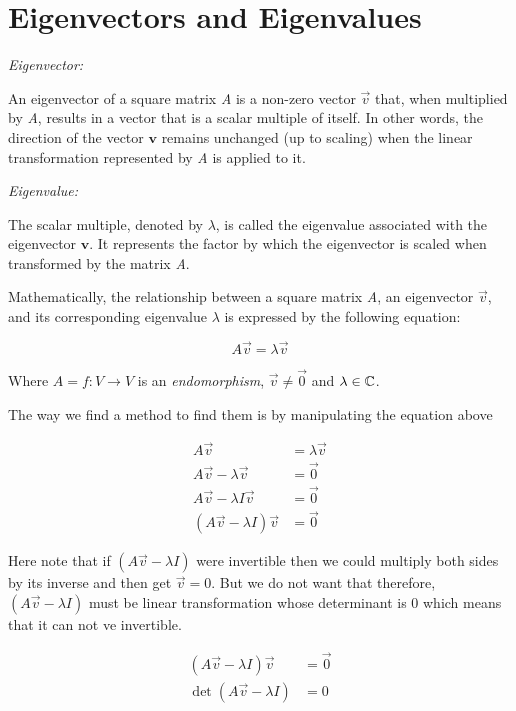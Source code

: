 \newpage
\section{Eigenvectors and Eigenvalues}

\emph{Eigenvector:}

An eigenvector of a square matrix \emph{A} is a non-zero vector \(\vec{v}\) that, when multiplied by 
\emph{A}, results in a vector that is a scalar multiple of itself. In other words, the direction of the 
vector \(\mathbf{v}\) remains unchanged (up to scaling) when the linear transformation represented by 
\emph{A} is applied to it.
\vspace{\baselineskip}

\emph{Eigenvalue:}

The scalar multiple, denoted by \(\lambda\), is called the eigenvalue associated with the eigenvector 
\(\mathbf{v}\). It represents the factor by which the eigenvector is scaled when transformed by 
the matrix \emph{A}.
\vspace{\baselineskip}

Mathematically, the relationship between a square matrix \emph{A}, an eigenvector \(\vec{v}\), 
and its corresponding eigenvalue \(\lambda\) is expressed by the following equation:

\[
    A\vec{v} = \lambda\vec{v}
\]

Where \(A = f: V \to V\) is an \emph{endomorphism}, \(\vec{v} \ne \vec{0}\) and  \(\lambda \in \mathbb{C}\).
\vspace{\baselineskip}

The way we find a method to find them is by manipulating the equation above

\begin{align*}    
    A\vec{v} &= \lambda\vec{v}\\
    A\vec{v} - \lambda\vec{v} &= \vec{0}\\
    A\vec{v} - \lambda I \vec{v} &= \vec{0}\\
    (A\vec{v} - \lambda I) \vec{v} &= \vec{0}
\end{align*}

Here note that if \((A\vec{v} - \lambda I)\) were invertible then we could multiply both sides by 
its inverse and then get \(\vec{v} = 0\). But we do not want that therefore, \((A\vec{v} - \lambda I)\) 
must be linear transformation whose determinant is \(0\) which means that it can not ve invertible.

\begin{align*}    
    (A\vec{v} - \lambda I) \vec{v} &= \vec{0}\\
    \det (A\vec{v} - \lambda I)  &= 0
\end{align*}

